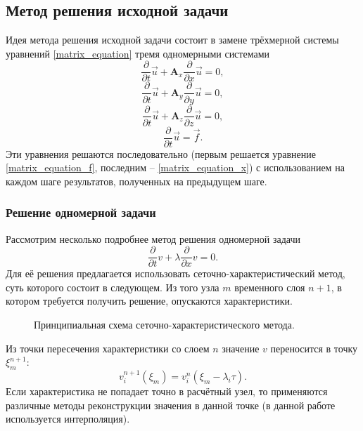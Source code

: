\subsection{Метод решения исходной задачи}
Идея метода \cite{fedorenko} решения исходной задачи состоит в замене трёхмерной системы
уравнений \ref{matrix_equation} тремя одномерными системами 
\begin{equation}
\frac{\partial}{\partial t}\vec u+\mathbf{A}_x \frac{\partial}{\partial x}\vec u
= 0,
\label{matrix_equation_x}
\end{equation}
\begin{equation}
\frac{\partial}{\partial t}\vec u+\mathbf{A}_y \frac{\partial}{\partial y}\vec u
= 0,
\label{matrix_equation_y}
\end{equation}
\begin{equation}
\frac{\partial}{\partial t}\vec u+\mathbf{A}_z \frac{\partial}{\partial z}\vec u
= 0,
\label{matrix_equation_z}
\end{equation}
\begin{equation}
\frac{\partial}{\partial t}\vec u = \vec f.
\label{matrix_equation_f}
\end{equation}
Эти уравнения решаются последовательно (первым решается уравнение
\ref{matrix_equation_f}, последним -- \ref{matrix_equation_x}) с использованием
на каждом шаге результатов, полученных на предыдущем шаге.
\subsubsection{Решение одномерной задачи}
Рассмотрим несколько подробнее метод решения одномерной задачи
\begin{equation}
\frac{\partial}{\partial t}v+\lambda \frac{\partial}{\partial x}v = 0.
\label{one_dim_eq}
\end{equation}
Для её решения предлагается использовать сеточно-характеристический метод, суть
которого состоит в следующем. Из того узла $m$ временного слоя $n+1$, в котором
требуется получить решение, опускаются характеристики.
\begin{figure}[h]
\caption{Принципиальная схема сеточно-характеристического метода.}
\end{figure}
Из точки пересечения характеристики со слоем $n$ значение $v$ переносится в 
точку $\xi^{n+1}_m$:
$$v_i^{n+1}(\xi_m)=v^{n}_i(\xi_m-\lambda_i\tau).$$
Если характеристика не попадает точно в расчётный узел, то применяются различные
методы реконструкции значения в данной точке (в данной работе используется
интерполяция).
